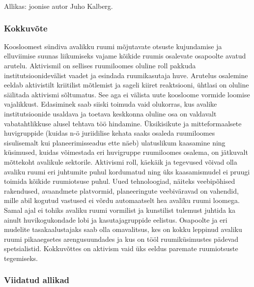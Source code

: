 \documentclass[estonian,]{article}
\begin{document}
\begin{imgsource}
{Allikas:} joonise autor Juho Kalberg.
\end{imgsource}

\hypertarget{kokkuvuxf5te-5}{%
\subsubsection*{Kokkuvõte}\label{kokkuvuxf5te-5}}

Koosloomest sündiva avalikku ruumi mõjutavate otsuste kujundamise ja elluviimise suunas liikumiseks vajame kõikide ruumis osalevate osapoolte avatud arutelu. Aktivismil on sellises ruumiloomes oluline roll pakkuda institutsioonidevälist vaadet ja esindada ruumikasutaja huve. Arutelus osalemine eeldab aktivistilt kriitilist mõtlemist ja sageli kiiret reaktsiooni, ühtlasi on oluline säilitada aktivismi sõltumatus. See aga ei välista uute koosloome vormide loomise vajalikkust. Edasiminek saab siiski toimuda vaid olukorras, kus avalike institutsioonide usaldava ja toetava keskkonna oluline osa on valdavalt vabatahtlikkuse alusel tehtava töö hindamine. Üksikisikute ja mitteformaalsete huvigruppide (kuidas n-ö juriidilise kehata saaks osaleda ruumiloomes sisulisemalt kui planeerimisseadus ette näeb) ulatuslikum kaasamine ning küsimused, kuidas võimestada eri huvigruppe ruumiloomes osalema, on jätkuvalt mõttekoht avalikule sektorile. Aktivismi roll, käekäik ja tegevused võivad olla avaliku ruumi eri juhtumite puhul kordumatud ning üks kaasamismudel ei pruugi toimida kõikide ruumiotsuse puhul. Uued tehnoloogiad, näiteks veebipõhised rakendused, avaandmete platvormid, planeeringute veebiväravad on vahendid, mille abil kogutud vastused ei võrdu automaatselt hea avaliku ruumi loomega. Samal ajal ei tohiks avaliku ruumi vormilist ja kunstilist tulemust juhtida ka ainult huvikogukondade lobi ja kasutajagruppide eelistus. Osapoolte ja eri mudelite tasakaalustajaks saab olla omavalitsus, kes on kokku leppinud avaliku ruumi pikaaegsetes arengusuundades ja kus on tööl ruumiküsimustes pädevad spetsialistid. Kokkuvõttes on aktivism vaid üks eeldus paremate ruumiotsuste tegemiseks.

\hypertarget{viidatud-allikad-9}{%
\subsubsection*{Viidatud allikad}\label{viidatud-allikad-9}}
\end{document}
